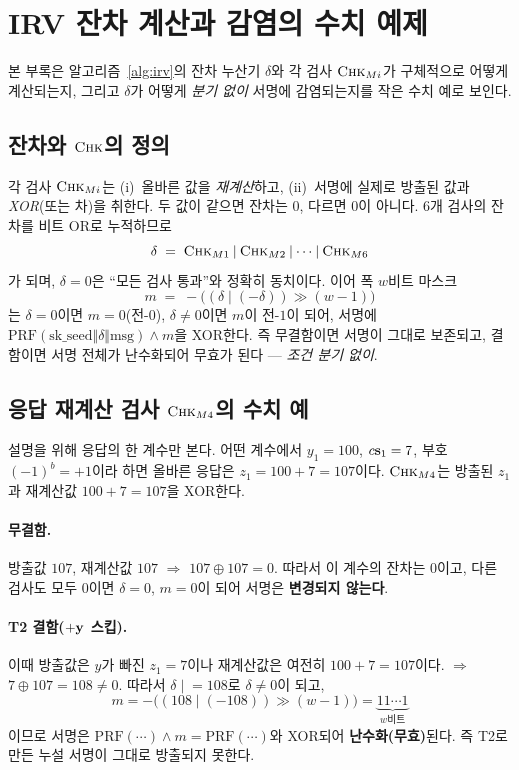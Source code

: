 \section{IRV 잔차 계산과 감염의 수치 예제}
\label{app:irv-example}

본 부록은 알고리즘~\ref{alg:irv}의 잔차 누산기 $\delta$와 각 검사 $\textsc{Chk}_{Mi}$가 구체적으로
어떻게 계산되는지, 그리고 $\delta$가 어떻게 \emph{분기 없이} 서명에 감염되는지를 작은 수치 예로 보인다.

\subsection{잔차와 $\textsc{Chk}$의 정의}
각 검사 $\textsc{Chk}_{Mi}$는 (i)~올바른 값을 \emph{재계산}하고, (ii)~서명에 실제로 방출된 값과
\emph{XOR}(또는 차)을 취한다. 두 값이 같으면 잔차는 $0$, 다르면 $0$이 아니다. 6개 검사의 잔차를 비트
OR로 누적하므로
\[
  \delta \;=\; \textsc{Chk}_{M1} \mathbin{|} \textsc{Chk}_{M2} \mathbin{|} \cdots \mathbin{|} \textsc{Chk}_{M6}
\]
가 되며, $\delta=0$은 ``모든 검사 통과''와 정확히 동치이다. 이어 폭 $w$비트 마스크
\[
  m \;=\; -\big((\delta \mathbin{|} (-\delta)) \gg (w-1)\big)
\]
는 $\delta=0$이면 $m=0$(전-$0$), $\delta\neq0$이면 $m$이 전-$1$이 되어, 서명에
$\mathrm{PRF}(\text{sk\_seed}\Vert\delta\Vert\text{msg}) \wedge m$을 XOR한다. 즉 무결함이면 서명이 그대로
보존되고, 결함이면 서명 전체가 난수화되어 무효가 된다 --- \emph{조건 분기 없이}.

\subsection{응답 재계산 검사 $\textsc{Chk}_{M4}$의 수치 예}
설명을 위해 응답의 한 계수만 본다. 어떤 계수에서 $y_1=100$, $c\mathbf{s}_1=7$, 부호 $(-1)^b=+1$이라 하면
올바른 응답은 $z_1 = 100+7 = 107$이다. $\textsc{Chk}_{M4}$는 방출된 $z_1$과 재계산값 $100+7=107$을
XOR한다.

\paragraph{무결함.} 방출값 $107$, 재계산값 $107$ $\Rightarrow$ $107 \oplus 107 = 0$. 따라서 이 계수의
잔차는 $0$이고, 다른 검사도 모두 $0$이면 $\delta=0$, $m=0$이 되어 서명은 \textbf{변경되지 않는다}.

\paragraph{T2 결함($+\mathbf{y}$ 스킵).} 이때 방출값은 $y$가 빠진 $z_1 = 7$이나 재계산값은 여전히
$100+7=107$이다. $\Rightarrow$ $7 \oplus 107 = 108 \neq 0$. 따라서 $\delta \mathrel{|}= 108$로
$\delta\neq0$이 되고,
\[
  m = -\big((108 \mathbin{|} (-108)) \gg (w-1)\big) = \underbrace{11\cdots1}_{w\text{비트}}
\]
이므로 서명은 $\mathrm{PRF}(\cdots)\wedge m = \mathrm{PRF}(\cdots)$와 XOR되어 \textbf{난수화(무효)}된다.
즉 T2로 만든 누설 서명이 그대로 방출되지 못한다.

